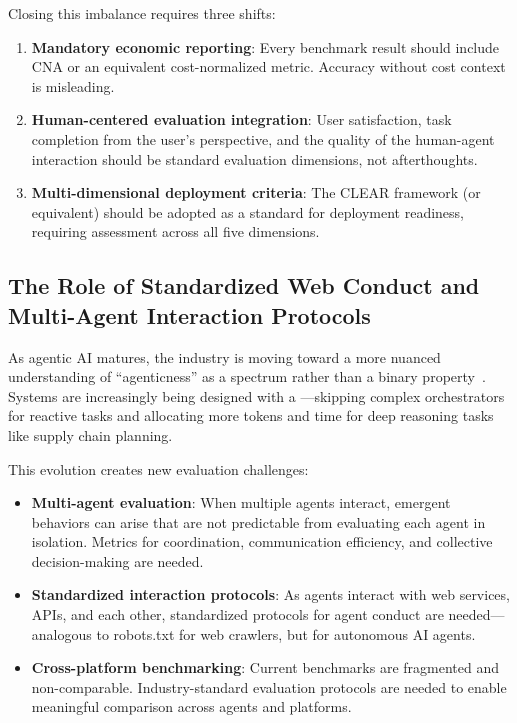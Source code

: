 Closing this imbalance requires three shifts:

\begin{enumerate}
    \item \textbf{Mandatory economic reporting}: Every benchmark result should include CNA or an equivalent cost-normalized metric. Accuracy without cost context is misleading.
    \item \textbf{Human-centered evaluation integration}: User satisfaction, task completion from the user's perspective, and the quality of the human-agent interaction should be standard evaluation dimensions, not afterthoughts.
    \item \textbf{Multi-dimensional deployment criteria}: The CLEAR framework (or equivalent) should be adopted as a standard for deployment readiness, requiring assessment across all five dimensions.
\end{enumerate}

\subsection{The Role of Standardized Web Conduct and Multi-Agent Interaction Protocols}

As agentic AI matures, the industry is moving toward a more nuanced understanding of ``agenticness'' as a spectrum rather than a binary property~\citep{aiagentindex}. Systems are increasingly being designed with a ---skipping complex orchestrators for reactive tasks and allocating more tokens and time for deep reasoning tasks like supply chain planning.

This evolution creates new evaluation challenges:

\begin{itemize}
    \item \textbf{Multi-agent evaluation}: When multiple agents interact, emergent behaviors can arise that are not predictable from evaluating each agent in isolation. Metrics for coordination, communication efficiency, and collective decision-making are needed.
    \item \textbf{Standardized interaction protocols}: As agents interact with web services, APIs, and each other, standardized protocols for agent conduct are needed---analogous to robots.txt for web crawlers, but for autonomous AI agents.
    \item \textbf{Cross-platform benchmarking}: Current benchmarks are fragmented and non-comparable. Industry-standard evaluation protocols are needed to enable meaningful comparison across agents and platforms.
\end{itemize}

